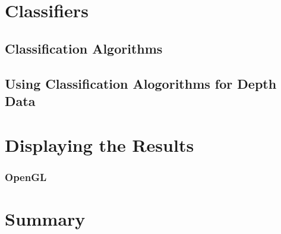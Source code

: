 \documentclass[11pt,openright,a4paper]{report}
\begin{document}
\chapter{Classifiers}
\section{Classification Algorithms}
\section{Using Classification Alogorithms for Depth Data}
\newpage

\chapter{Displaying the Results}
\subsection{OpenGL}


\chapter{Summary}
\newpage
\end{document}
